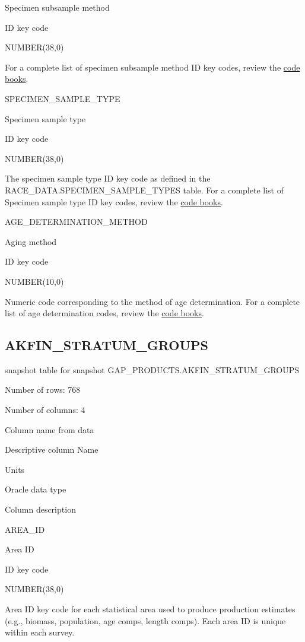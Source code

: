 \documentclass[
  letterpaper,
  oneside,
  open=any]{scrbook}
\begin{document}
Specimen subsample method

ID key code

NUMBER(38,0)

For a complete list of specimen subsample method ID key codes, review
the
\href{https://www.fisheries.noaa.gov/resource/document/groundfish-survey-species-code-manual-and-data-codes-manual}{code
books}.

SPECIMEN\_SAMPLE\_TYPE

Specimen sample type

ID key code

NUMBER(38,0)

The specimen sample type ID key code as defined in the
RACE\_DATA.SPECIMEN\_SAMPLE\_TYPES table. For a complete list of
Specimen sample type ID key codes, review the
\href{https://www.fisheries.noaa.gov/resource/document/groundfish-survey-species-code-manual-and-data-codes-manual}{code
books}.

AGE\_DETERMINATION\_METHOD

Aging method

ID key code

NUMBER(10,0)

Numeric code corresponding to the method of age determination. For a
complete list of age determination codes, review the
\href{https://www.fisheries.noaa.gov/resource/document/groundfish-survey-species-code-manual-and-data-codes-manual}{code
books}.

\subsection{AKFIN\_STRATUM\_GROUPS}\label{akfin_stratum_groups}

snapshot table for snapshot GAP\_PRODUCTS.AKFIN\_STRATUM\_GROUPS

Number of rows: 768

Number of columns: 4

Column name from data

Descriptive column Name

Units

Oracle data type

Column description

AREA\_ID

Area ID

ID key code

NUMBER(38,0)

Area ID key code for each statistical area used to produce production
estimates (e.g., biomass, population, age comps, length comps). Each
area ID is unique within each survey.
\end{document}
